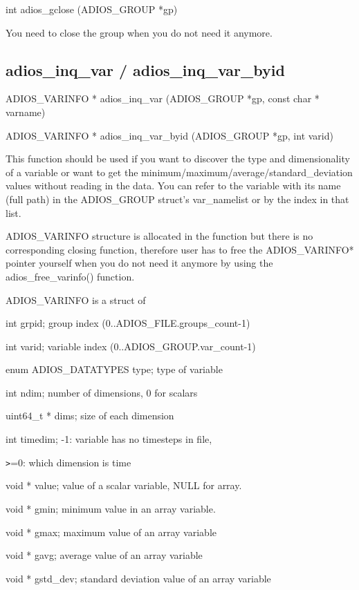 int adios\_gclose (ADIOS\_GROUP *gp)

You need to close the group when you do not need it anymore. \label{HRef140808163}\label{HToc182553405}

\subsection{adios\_inq\_var / adios\_inq\_var\_byid}

ADIOS\_VARINFO * adios\_inq\_var (ADIOS\_GROUP *gp, const char * varname)

ADIOS\_VARINFO * adios\_inq\_var\_byid (ADIOS\_GROUP *gp, int varid)

This function should be used if you want to discover the type and dimensionality 
of a variable or want to get the minimum/maximum/average/standard\_deviation values 
without reading in the data. You can refer to the variable with its name (full 
path) in the ADIOS\_GROUP struct's var\_namelist or by the index in that list. 

ADIOS\_VARINFO structure is allocated in the function but there is no corresponding 
closing function, therefore user has to free the ADIOS\_VARINFO* pointer yourself 
when you do not need it anymore by using the adios\_free\_varinfo() function.

ADIOS\_VARINFO is a struct of 

\leftskip=22pt
int  grpid;  group index (0..ADIOS\_FILE.groups\_count-1)

int  varid; variable index (0..ADIOS\_GROUP.var\_count-1)

enum ADIOS\_DATATYPES type;           type of variable

int ndim;  number of dimensions, 0 for scalars 

uint64\_t  * dims;  size of each dimension 

int timedim;  -1: variable has no timesteps in file,

\parindent=39pt
\texttt{>}=0: which dimension is time

\parindent=0pt
void      * value;  value of a scalar variable, NULL for array.

void      * gmin;  minimum value in an array variable. 

void      * gmax;  maximum value of an array variable 

void      *      gavg; average value of an array variable

void      *      gstd\_dev; standard deviation value of an array variable

